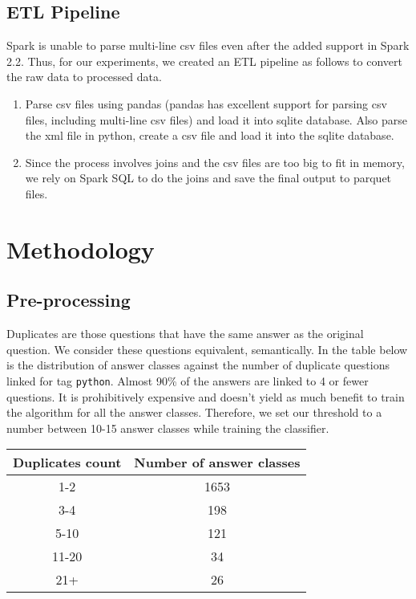\documentclass{article}
\begin{document}
\subsection{ETL Pipeline}
Spark\cite{spark} is unable to parse multi-line csv files even after the added support in Spark 2.2. Thus, for our experiments, we created an ETL pipeline as follows to convert the raw data to processed data.
\begin{enumerate}
	\item Parse csv files using pandas\cite{pandas} (pandas has excellent support for parsing csv files, including multi-line csv files) and load it into sqlite database. Also parse the xml file in python, create a csv file and load it into the sqlite\cite{sqlite} database.
	\item Since the process involves joins and the csv files are too big to fit in memory, we rely on Spark SQL to do the joins and save the final output to parquet files.
\end{enumerate}

\section{Methodology}
\subsection{Pre-processing}
Duplicates are those questions that have the same answer as the original question. We consider these questions equivalent, semantically. In the table below is the distribution of answer classes against the number of duplicate questions linked for tag \texttt{python}. Almost 90\% of the answers are linked to 4 or fewer questions. It is prohibitively expensive and doesn't yield as much benefit to train the algorithm for all the answer classes. Therefore, we set our threshold to a number between 10-15 answer classes while training the classifier.

\begin{center}
	\begin{tabular}
		{|c c|} 
		\hline
		Duplicates count & Number of answer classes\\ 
		\hline\hline
		1-2 & 1653 \\ 
		\hline
		3-4 & 198 \\
		\hline
		5-10 & 121 \\
		\hline
		11-20 & 34 \\
		\hline
		21+ & 26 \\
		\hline
	\end{tabular}
\end{center}
\end{document}
